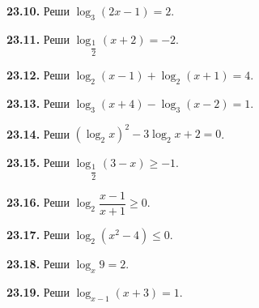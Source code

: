 \noindent\begin{minipage}[t]{\linewidth}\textbf{23.10.} Реши \(\log_3(2x-1)=2\).\par\end{minipage}\par
\noindent\begin{minipage}[t]{\linewidth}\textbf{23.11.} Реши \(\log_{\dfrac12}(x+2)=-2\).\par\end{minipage}\par
\noindent\begin{minipage}[t]{\linewidth}\textbf{23.12.} Реши \(\log_2(x-1)+\log_2(x+1)=4\).\par\end{minipage}\par
\noindent\begin{minipage}[t]{\linewidth}\textbf{23.13.} Реши \(\log_3(x+4)-\log_3(x-2)=1\).\par\end{minipage}\par
\noindent\begin{minipage}[t]{\linewidth}\textbf{23.14.} Реши \((\log_2x)^2-3\log_2x+2=0\).\par\end{minipage}\par
\noindent\begin{minipage}[t]{\linewidth}\textbf{23.15.} Реши \(\log_{\dfrac12}(3-x)\geq-1\).\par\end{minipage}\par
\noindent\begin{minipage}[t]{\linewidth}\textbf{23.16.}\starmark{} Реши \(\log_2\dfrac{x-1}{x+1}\geq0\).\par\end{minipage}\par
\noindent\begin{minipage}[t]{\linewidth}\textbf{23.17.}\starmark{} Реши \(\log_2(x^2-4)\leq0\).\par\end{minipage}\par
\noindent\begin{minipage}[t]{\linewidth}\textbf{23.18.} Реши \(\log_x9=2\).\par\end{minipage}\par
\noindent\begin{minipage}[t]{\linewidth}\textbf{23.19.} Реши \(\log_{x-1}(x+3)=1\).\par\end{minipage}\par
